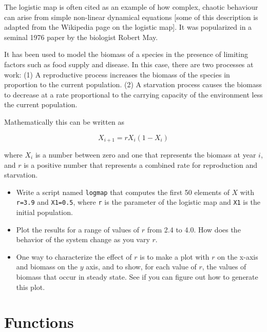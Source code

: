 \documentclass{book}
\begin{document}
\begin{ex}
The logistic map is often cited as an example of how complex, chaotic
behaviour can arise from simple non-linear dynamical equations [some
of this description is adapted from the Wikipedia page on the logistic
map]. It was popularized in a seminal 1976 paper by the biologist
Robert May.

It has been used to model the biomass of a
species in the presence of limiting factors such as food supply and
disease.  In this case, there are two processes at work:
(1) A reproductive process increases the biomass of the species
in proportion to the current population.
(2) A starvation process causes the biomass to decrease at a rate
proportional to the carrying capacity of the environment less the
current population.

Mathematically this can be written as

\begin{equation}
X_{i+1} = r X_i (1-X_i)
\end{equation}

where $X_i$ is a number between zero and one that represents the
biomass at year $i$, and $r$ is a positive number that represents a
combined rate for reproduction and starvation.

\begin{itemize}

\item Write a script named {\tt logmap} that computes the first 50
elements of $X$ with {\tt r=3.9} and {\tt X1=0.5}, where
{\tt r} is the parameter of the logistic map and {\tt X1} is the
initial population.

\item Plot the results for a range of values of $r$ from 2.4 to 4.0.
How does the behavior of the system change as you vary $r$.

\item One way to characterize the effect of $r$ is to make a plot
with $r$ on the x-axis and biomass on the $y$ axis, and to show,
for each value of $r$, the values of biomass that occur in steady
state.  See if you can figure out how to generate this plot.

\end{itemize}

\end{ex}


\chapter{Functions}
\end{document}
